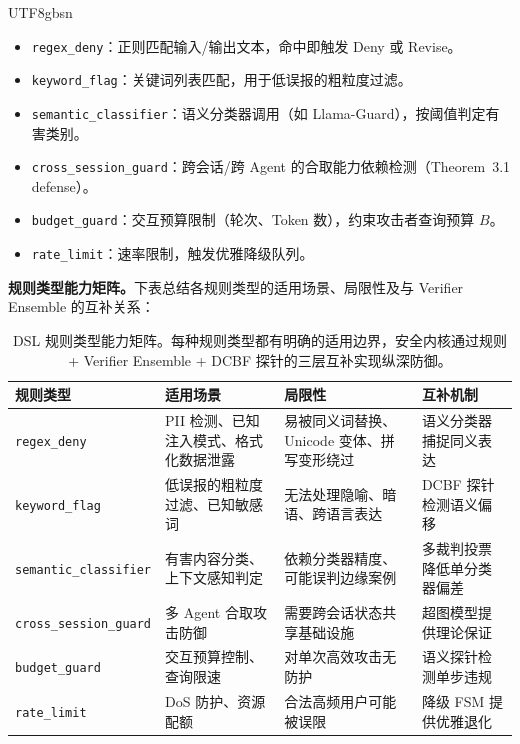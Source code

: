 \documentclass[letterpaper,twocolumn,10pt]{article}
\begin{document}
\begin{CJK}{UTF8}{gbsn}
\begin{itemize}
\item \texttt{regex\_deny}：正则匹配输入/输出文本，命中即触发 Deny 或 Revise。
\item \texttt{keyword\_flag}：关键词列表匹配，用于低误报的粗粒度过滤。
\item \texttt{semantic\_classifier}：语义分类器调用（如 Llama-Guard），按阈值判定有害类别。
\item \texttt{cross\_session\_guard}：跨会话/跨 Agent 的合取能力依赖检测（Theorem~3.1 defense）。
\item \texttt{budget\_guard}：交互预算限制（轮次、Token 数），约束攻击者查询预算 $B$。
\item \texttt{rate\_limit}：速率限制，触发优雅降级队列。
\end{itemize}

\noindent\textbf{规则类型能力矩阵。}下表总结各规则类型的适用场景、局限性及与 Verifier Ensemble 的互补关系：

\begin{table}[h]
\centering
\small
\setlength{\tabcolsep}{3pt}
\begin{tabular}{@{}p{2.8cm}p{3.5cm}p{3.5cm}p{3.2cm}@{}}
\toprule
\textbf{规则类型} & \textbf{适用场景} & \textbf{局限性} & \textbf{互补机制} \\
\midrule
\texttt{regex\_deny} & PII 检测、已知注入模式、格式化数据泄露 & 易被同义词替换、Unicode 变体、拼写变形绕过 & 语义分类器捕捉同义表达 \\
\texttt{keyword\_flag} & 低误报的粗粒度过滤、已知敏感词 & 无法处理隐喻、暗语、跨语言表达 & DCBF 探针检测语义偏移 \\
\texttt{semantic\_classifier} & 有害内容分类、上下文感知判定 & 依赖分类器精度、可能误判边缘案例 & 多裁判投票降低单分类器偏差 \\
\texttt{cross\_session\_guard} & 多 Agent 合取攻击防御 & 需要跨会话状态共享基础设施 & 超图模型提供理论保证 \\
\texttt{budget\_guard} & 交互预算控制、查询限速 & 对单次高效攻击无防护 & 语义探针检测单步违规 \\
\texttt{rate\_limit} & DoS 防护、资源配额 & 合法高频用户可能被误限 & 降级 FSM 提供优雅退化 \\
\bottomrule
\end{tabular}
\caption{DSL 规则类型能力矩阵。每种规则类型都有明确的适用边界，安全内核通过规则 + Verifier Ensemble + DCBF 探针的三层互补实现纵深防御。}
\label{tab:dsl-capability-matrix}
\end{table}


\end{CJK}
\end{document}
